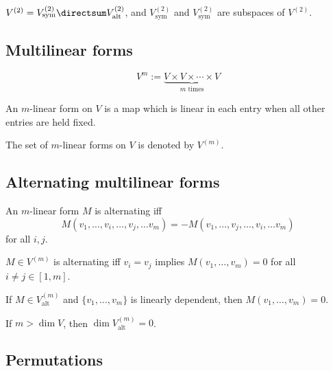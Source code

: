 \begin{lemma}
  $V^{(2)} = V^{(2)}_{\text{sym}} \directsum V^{(2)}_{\text{alt}}$, and $V^{(2)}_{\text{sym}}$ and $V^{(2)}_{\text{sym}}$ are subspaces of $V^{(2)}$.
\end{lemma}

\subsection{Multilinear forms}

\begin{definition}
  \[
    V^m := \underbrace{V \times V \times \cdots \times V}_{\text{$m$ times}}
  \]
\end{definition}

\begin{definition}
  An $m$-linear form on $V$ is a map which is linear in each entry when all other entries are held fixed.

  The set of $m$-linear forms on $V$ is denoted by $V^{(m)}$.
\end{definition}

\subsection{Alternating multilinear forms}

\begin{definition}
  An $m$-linear form $M$ is alternating iff
  \[
    M(v_1, \ldots, v_i, \ldots, v_j, \ldots v_m) = -M(v_1, \ldots, v_j, \ldots, v_i, \ldots v_m)
  \]
  for all $i, j$. 
\end{definition}

\begin{lemma}
  $M \in V^{(m)}$ is alternating iff $v_i = v_j$ implies $M(v_1, \ldots, v_m) = 0$ for all $i \neq j \in [1, m]$.
\end{lemma}

\begin{lemma}
  If $M \in V^{(m)}_{\text{alt}}$ and $\{ v_1, \ldots, v_m \}$ is linearly dependent, then $M(v_1, \ldots, v_m) = 0$.
\end{lemma}

\begin{lemma}
  If $m > \dim V$, then $\dim V^{(m)}_{\text{alt}} = 0$.
\end{lemma}

\subsection{Permutations}

